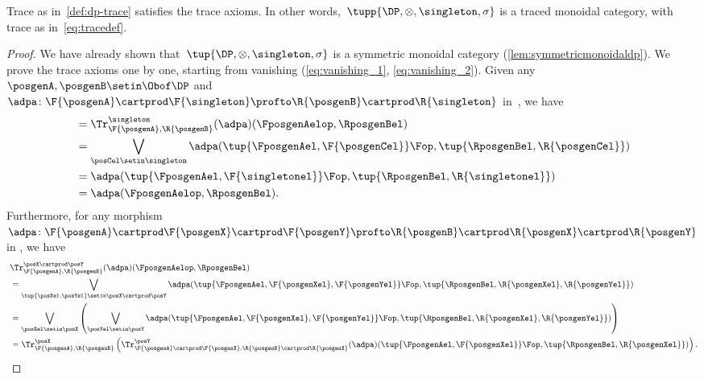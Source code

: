 {    \begin{lemma}
        Trace as in~\cref{def:dp-trace} satisfies the trace axioms.
        In other words,~$\tupp{\DP, \otimes, \singleton, \sigma}$ is a traced monoidal category, with trace as in~\cref{eq:tracedef}.
    \end{lemma}
    \begin{proof}
        We have already shown that~$\tup{\DP,\otimes,\singleton,\sigma}$ is a symmetric monoidal category (\cref{lem:symmetricmonoidaldp}).
        We prove the trace axioms one by one, starting from vanishing (\cref{eq:vanishing_1}, \cref{eq:vanishing_2}).
        Given any~$\posgenA,\posgenB\setin \Obof\DP$ and~$\adpa\colon \F{\posgenA}\cartprod \F{\singleton}\profto \R{\posgenB}\cartprod \R{\singleton}$ in~\DP, we have
        \begin{equation}
            \begin{aligned}
                 & = \Tr_{\F{\posgenA},\R{\posgenB}}^{\singleton}(\adpa)(\FposgenAelop,\RposgenBel) \\
                 & =\bigvee_{\posCel\setin \singleton}\adpa(\tup{\FposgenAel,\F{\posgenCel}}\Fop,\tup{\RposgenBel,\R{\posgenCel}}) \\
                 & =\adpa(\tup{\FposgenAel,\F{\singletonel}}\Fop,\tup{\RposgenBel,\R{\singletonel}}) \\
                 & =\adpa(\FposgenAelop,\RposgenBel).
            \end{aligned}
        \end{equation}
        Furthermore, for any morphism~$\adpa\colon \F{\posgenA}\cartprod \F{\posgenX}\cartprod \F{\posgenY} \profto \R{\posgenB}\cartprod \R{\posgenX} \cartprod \R{\posgenY}$ in \DP, we have
        \begin{equation}
            \begin{aligned}
                ~ & \Tr_{\F{\posgenA},\R{\posgenB}}^{\posX\cartprod \posY}(\adpa)(\FposgenAelop,\RposgenBel) \\
                  & = \bigvee_{\tup{\posXel,\posYel} \setin \posX\cartprod \posY} \adpa(\tup{\FposgenAel,\F{\posgenXel},\F{\posgenYel}}\Fop,\tup{\RposgenBel,\R{\posgenXel},\R{\posgenYel}}) \\
                  & =\bigvee_{\posXel \setin \posX}\left(\bigvee_{\posYel \setin \posY} \adpa(\tup{\FposgenAel,\F{\posgenXel},\F{\posgenYel}}\Fop,\tup{\RposgenBel,\R{\posgenXel},\R{\posgenYel}})\right) \\
                  & =\Tr_{\F{\posgenA},\R{\posgenB}}^\posX\left(
                \Tr_{\F{\posgenA}\cartprod \F{\posgenX},\R{\posgenB}\cartprod \R{\posgenX}}^\posY(\adpa)(\tup{\FposgenAel,\F{\posgenXel}}\Fop,\tup{\RposgenBel,\R{\posgenXel}})\right).

\end{aligned}
\end{equation}
\end{proof}}
